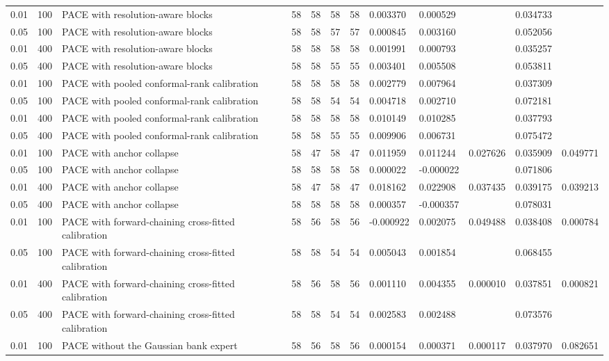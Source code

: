 \begin{tabular}{llllllllllll}
0.01 & 100 & PACE with resolution-aware blocks & 58 & 58 & 58 & 58 & 0.003370 & 0.000529 &  & 0.034733 &  \\
0.05 & 100 & PACE with resolution-aware blocks & 58 & 58 & 57 & 57 & 0.000845 & 0.003160 &  & 0.052056 &  \\
0.01 & 400 & PACE with resolution-aware blocks & 58 & 58 & 58 & 58 & 0.001991 & 0.000793 &  & 0.035257 &  \\
0.05 & 400 & PACE with resolution-aware blocks & 58 & 58 & 55 & 55 & 0.003401 & 0.005508 &  & 0.053811 &  \\
0.01 & 100 & PACE with pooled conformal-rank calibration & 58 & 58 & 58 & 58 & 0.002779 & 0.007964 &  & 0.037309 &  \\
0.05 & 100 & PACE with pooled conformal-rank calibration & 58 & 58 & 54 & 54 & 0.004718 & 0.002710 &  & 0.072181 &  \\
0.01 & 400 & PACE with pooled conformal-rank calibration & 58 & 58 & 58 & 58 & 0.010149 & 0.010285 &  & 0.037793 &  \\
0.05 & 400 & PACE with pooled conformal-rank calibration & 58 & 58 & 55 & 55 & 0.009906 & 0.006731 &  & 0.075472 &  \\
0.01 & 100 & PACE with anchor collapse & 58 & 47 & 58 & 47 & 0.011959 & 0.011244 & 0.027626 & 0.035909 & 0.049771 \\
0.05 & 100 & PACE with anchor collapse & 58 & 58 & 58 & 58 & 0.000022 & -0.000022 &  & 0.071806 &  \\
0.01 & 400 & PACE with anchor collapse & 58 & 47 & 58 & 47 & 0.018162 & 0.022908 & 0.037435 & 0.039175 & 0.039213 \\
0.05 & 400 & PACE with anchor collapse & 58 & 58 & 58 & 58 & 0.000357 & -0.000357 &  & 0.078031 &  \\
0.01 & 100 & PACE with forward-chaining cross-fitted calibration & 58 & 56 & 58 & 56 & -0.000922 & 0.002075 & 0.049488 & 0.038408 & 0.000784 \\
0.05 & 100 & PACE with forward-chaining cross-fitted calibration & 58 & 58 & 54 & 54 & 0.005043 & 0.001854 &  & 0.068455 &  \\
0.01 & 400 & PACE with forward-chaining cross-fitted calibration & 58 & 56 & 58 & 56 & 0.001110 & 0.004355 & 0.000010 & 0.037851 & 0.000821 \\
0.05 & 400 & PACE with forward-chaining cross-fitted calibration & 58 & 58 & 54 & 54 & 0.002583 & 0.002488 &  & 0.073576 &  \\
0.01 & 100 & PACE without the Gaussian bank expert & 58 & 56 & 58 & 56 & 0.000154 & 0.000371 & 0.000117 & 0.037970 & 0.082651 \\

\end{tabular}
